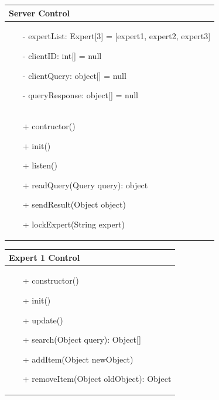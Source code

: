 \documentclass[]{article}
\begin{document}
\begin{table}[H]
\centering
\begin{tabular}{|>{\centering\arraybackslash}p{10cm}|}
\hline
Server Control\\
\hline
\begin{itemize}
\item[-] expertList: Expert[3] = [expert1, expert2, expert3]
\item[-] clientID: int[] = null
\item[-] clientQuery: object[] = null
\item[-] queryResponse: object[] = null

\end{itemize}
\\
\hline
\begin{itemize}
\item[+] contructor()
\item[+] init()
\item[+] listen()
\item[+] readQuery(Query query): object
\item[+] sendResult(Object object)
\item[+] lockExpert(String expert)
\end{itemize}
\\
\hline
\end{tabular}
\end{table}
%
\begin{table}[H]
\centering
\begin{tabular}{|>{\centering\arraybackslash}p{10cm}|}
\hline
Expert 1 Control\\
\hline
\begin{itemize}
\item[+] constructor()
\item[+] init()
\item[+] update()
\item[+] search(Object query): Object[]
\item[+] addItem(Object newObject)
\item[+] removeItem(Object oldObject): Object
\end{itemize}
\\
\hline
\end{tabular}
\end{table}
%
\end{document}
